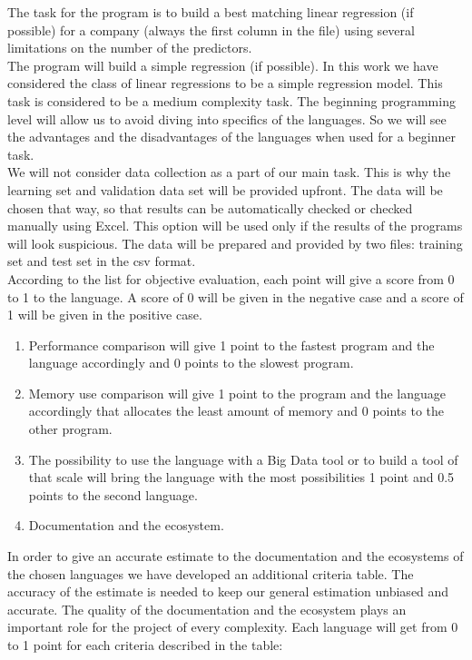 \documentclass[
  twoside,
  11pt, a4paper,
  footinclude=true,
  headinclude=true,
  cleardoublepage=empty
]{scrreprt}
\begin{document}
    The task for the program is to build a best matching linear regression (if possible) for a company (always the first column in the file) using several limitations on the number of the predictors.\\
    The program will build a simple regression (if possible). In this work we have considered the class of linear regressions to be a simple regression model. This task is considered to be a medium complexity task. The beginning programming level will allow us to avoid diving into specifics of the languages. So we will see the advantages and the disadvantages of the languages when used for a beginner task.\\
    We will not consider data collection as a part of our main task. This is why the learning set and validation data set will be provided upfront. The data will be chosen that way, so that results can be automatically checked or checked manually using Excel. This option will be used only if the results of the programs will look suspicious. The data will be prepared and provided by two files: training set and test set in the csv format.\\
    According to the list for objective evaluation, each point will give a score from 0 to 1 to the language. A score of 0 will be given in the negative case and a score of 1 will be given in the positive case.
    \begin{enumerate}
        \item Performance comparison will give 1 point to the fastest program and the language accordingly and 0 points to the slowest program.
        \item Memory use comparison will give 1 point to the program and the language accordingly that allocates the least amount of memory and 0 points to the other program.
        \item The possibility to use the language with a Big Data tool or to build a tool of that scale will bring the language with the most possibilities 1 point and 0.5 points to the second language.
        \item Documentation and the ecosystem.
    \end{enumerate}
    In order to give an accurate estimate to the documentation and the ecosystems of the chosen languages we have developed an additional criteria table. The accuracy of the estimate is needed to keep our general estimation unbiased and accurate. The quality of the documentation and the ecosystem plays an important role for the project of every complexity. Each language will get from 0 to 1 point for each criteria described in the table:
\end{document}
